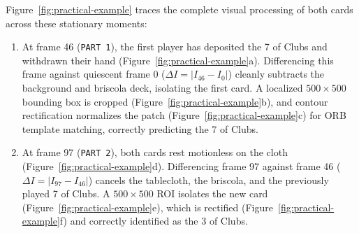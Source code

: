 \documentclass[11pt,a4paper]{article}
\begin{document}
Figure~\ref{fig:practical-example} traces the complete visual processing of both
cards across these stationary moments:
\begin{enumerate}
    \item At frame 46 (\texttt{PART 1}), the first player has deposited the 7 of
    Clubs and withdrawn their hand (Figure~\ref{fig:practical-example}a).
    Differencing this frame against quiescent frame 0 ($\Delta I = |I_{46} - I_0|$)
    cleanly subtracts the background and briscola deck, isolating the first card.
    A localized $500 \times 500$ bounding box is cropped
    (Figure~\ref{fig:practical-example}b), and contour rectification normalizes the
    patch (Figure~\ref{fig:practical-example}c) for ORB template matching, correctly
    predicting the 7 of Clubs.
    \item At frame 97 (\texttt{PART 2}), both cards rest motionless on the cloth
    (Figure~\ref{fig:practical-example}d). Differencing frame 97 against frame 46
    ($\Delta I = |I_{97} - I_{46}|$) cancels the tablecloth, the briscola, and the previously
    played 7 of Clubs. A $500 \times 500$ ROI isolates the new card
    (Figure~\ref{fig:practical-example}e), which is rectified
    (Figure~\ref{fig:practical-example}f) and correctly identified as the
    3 of Clubs.
\end{enumerate}
\end{document}
